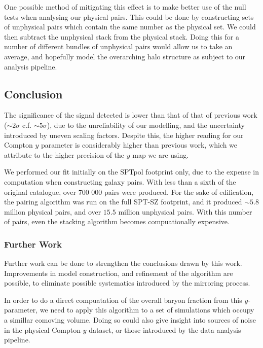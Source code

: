 \par One possible method of mitigating this effect is to make better use of the null tests when analysing our physical pairs. This could be done by constructing sets of unphysical pairs which contain the same number as the physical set. We could then subtract the unphysical stack from the physical stack. Doing this for a number of different bundles of unphysical pairs would allow us to take an average, and hopefully model the overarching halo structure as subject to our analysis pipeline. 

\subsection{Conclusion}
\par The significance of the signal detected is lower than that of that of previous work ($\sim 2\sigma$ c.f. $\sim 5 \sigma$), due to the unreliability of our modelling, and the uncertainty introduced by uneven scaling factors. Despite this, the higher reading for our Compton $y$ parameter is considerably higher than previous work, which we attribute to the higher precision of the $y$ map we are using. 

\par We performed our fit initially on the SPTpol footprint only, due to the expense in computation when constructing galaxy pairs. With less than a sixth of the original catalogue, over 700 000 pairs were produced. For the sake of edification, the pairing algorithm was run on the full SPT-SZ footprint, and it produced $\sim 5.8$ million physical pairs, and over $15.5$ million unphysical pairs. With this number of pairs, even the stacking algorithm becomes compuationally expensive. 

\subsubsection{Further Work}
	
\par Further work can be done to strengthen the conclusions drawn by this work. Improvements in model construction, and refinement of the algorithm are possible, to eliminate possible systematics introduced by the mirroring process. 

\par In order to do a direct compuatation of the overall baryon fraction from this $y$-parameter, we need to apply this algorithm to a set of simulations which occupy a simillar comoving volume. Doing so could also give insight into sources of noise in the physical Compton-$y$ dataset, or those introduced by the data analysis pipeline.

